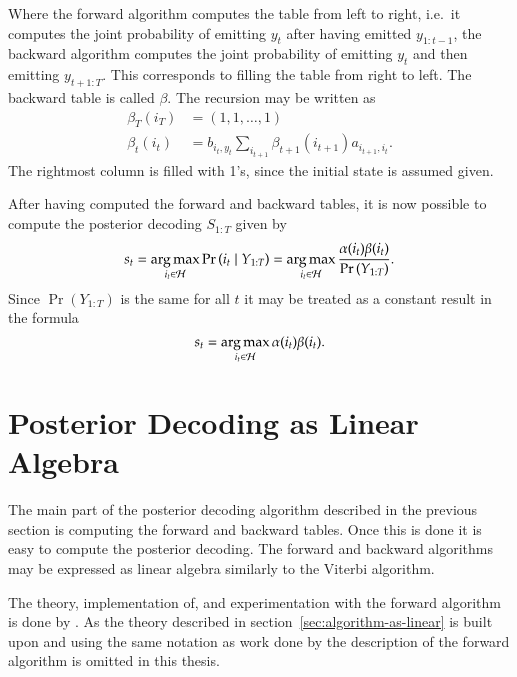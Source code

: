 Where the forward algorithm computes the table from left to right, i.e.\
it computes the joint probability of emitting $y_t$ after having emitted
$y_{1:t-1}$, the backward algorithm computes the joint probability of emitting
$y_t$ and then emitting $y_{t+1:T}$. This corresponds to filling the table from
right to left. The backward table is called $\beta$. The recursion may be written as
\begin{equation}
  \label{eq:9}
  \begin{aligned}
    \beta_T(i_T) &= (1, 1, \dots, 1) \\
    \beta_t(i_t) &= b_{i_t, y_t} \sum_{i_{t + 1}} \beta_{t + 1}(i_{t + 1})
    a_{i_{t + 1}, i_t}.
  \end{aligned}
\end{equation}
The rightmost column is filled with 1's, since the initial state is assumed
given.

After having computed the forward and backward tables, it is now possible to
compute the posterior decoding $S_{1:T}$ given by
\begin{equation*}
  s_t = \operatorname*{arg\,max}_{i_t \in \mathcal{H}} \Pr \left(i_t \mid Y_{1:T} \right) =
  \operatorname*{arg\,max}_{i_t \in \mathcal{H}} \frac{\alpha(i_t) \beta(i_t)}{\Pr \left( Y_{1:T} \right)}.
\end{equation*}
Since $\Pr ( Y_{1:T} )$ is the same for all $t$ it may be treated as
a constant result in the formula
\begin{equation}
  \label{eq:6}
  s_t = \operatorname*{arg\,max}_{i_t \in \mathcal{H}} \alpha(i_t) \beta(i_t).
\end{equation}

\section{Posterior Decoding as Linear Algebra}

The main part of the posterior decoding algorithm described in the previous
section is computing the forward and backward tables. Once this is done it is
easy to compute the posterior decoding. The forward and backward algorithms may
be expressed as linear algebra similarly to the Viterbi algorithm.

The theory, implementation of, and experimentation with the forward algorithm
is done by \citet{sand2013ziphmmlib}. As the theory described in
section~\ref{sec:algorithm-as-linear} is built upon and using the same notation
as work done by \citet{sand2013ziphmmlib} the description of the forward
algorithm is omitted in this thesis.

